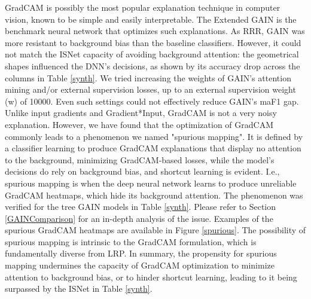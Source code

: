 \documentclass[fleqn,10pt]{wlscirep}
\begin{document}
{GradCAM\cite{GradCAM} is possibly the most popular explanation technique in computer vision, known to be simple and easily interpretable\cite{GradCAM}. The Extended GAIN\cite{GAIN} is the benchmark neural network that optimizes such explanations. As RRR, GAIN was more resistant to background bias than the baseline classifiers. However, it could not match the ISNet capacity of avoiding background attention: the geometrical shapes influenced the DNN's decisions, as shown by its accuracy drop across the columns in Table \ref{synth}. We tried increasing the weights of GAIN's attention mining and/or external supervision losses\cite{GAIN},
up to an external supervision weight (w) of 10000. Even such settings could not effectively reduce GAIN’s maF1 gap. Unlike input gradients and Gradient*Input, GradCAM is not a very noisy explanation. However, we have found that the optimization of GradCAM commonly leads to a phenomenon we named "spurious mapping". It is defined by a classifier learning to produce GradCAM explanations that display no attention to the background, minimizing GradCAM-based losses, while the model's decisions do rely on background bias, and shortcut learning is evident. I.e., spurious mapping is when the deep neural network learns to produce unreliable GradCAM heatmaps, which hide its background attention. The phenomenon was verified for the tree GAIN models in Table \ref{synth}. Please refer to Section \ref{GAINComparison} for an in-depth analysis of the issue. Examples of the spurious GradCAM heatmaps are available in Figure \ref{spurious}. The possibility of spurious mapping is intrinsic to the GradCAM formulation, which is fundamentally diverse from LRP. In summary, the propensity for spurious mapping undermines the capacity of GradCAM optimization to minimize attention to background bias, or to hinder shortcut learning, leading to it being surpassed by the ISNet in Table \ref{synth}.

}
\end{document}
